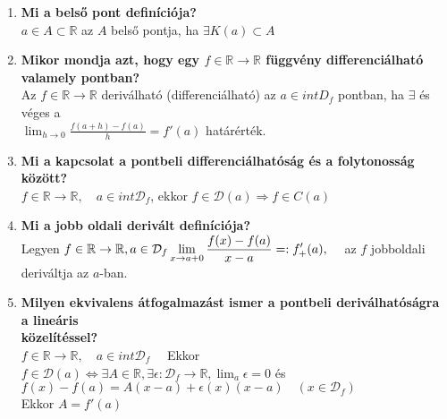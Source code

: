 \documentclass[a4paper,11pt]{article}
\begin{document}
\def\Z{\mathbb{Z}}
\def\R{\mathbb{R}}
\def\limn{\displaystyle\lim_{n\to +\infty}}
\def\limh{\displaystyle\lim_{h\to0}}
\def\limxa{\displaystyle\lim_{x\to a}}
\def\rtr{\displaystyle\R\to\R}
\def\D{\displaystyle\mathcal{D}}
\def\lima{\displaystyle\lim_{a}}
\def\fda{f\in\D(a)}
\begin{enumerate}
	\item \textbf{Mi a belső pont definíciója?}\\[0.1cm]$a\in A\subset\R$ az $A$ belső pontja, ha $\exists K(a)\subset A$
	\item \textbf{Mikor mondja azt, hogy egy $f\in\rtr$ függvény differenciálható valamely pontban?}\\[0.1cm]Az $f\in\rtr$ deriválható (differenciálható) az $a\in int D_f$ pontban, ha $\exists$ és véges a\\[0.1cm]$\limh\frac{f(a+h)-f(a)}{h}=f'(a)$ határérték.
	\item \textbf{Mi a kapcsolat a pontbeli differenciálhatóság és a folytonosság között?}\\[0.1cm]$f\in\rtr,\quad a\in int\D_f$, ekkor\hspace{1cm} $\fda\Rightarrow f\in C(a)$
	\item \textbf{Mi a jobb oldali derivált definíciója?}\\[0.1cm]Legyen $f\in\rtr,a\in\D_f\\[0.1cm]\displaystyle\lim_{x\to a+0}\frac{f(x)-f(a)} {x-a}=:f'_+(a),\quad$ az $f$ jobboldali deriváltja az $a$-ban.
	\item \textbf{Milyen ekvivalens átfogalmazást ismer a pontbeli deriválhatóságra a lineáris \\ közelítéssel?}\\[0.1cm]$f\in\rtr,\quad a\in int\D_f\quad$ Ekkor\\[0.1cm]$\fda\Leftrightarrow\exists A\in\R, \exists\epsilon:\D_f\to\R,\lima\epsilon=0$ és $f(x)-f(a)=A(x-a)+ \epsilon(x)(x-a)\quad(x\in\D_f)$\\[0.1cm]Ekkor $A=f'(a)$
\end{enumerate}
\end{document}

